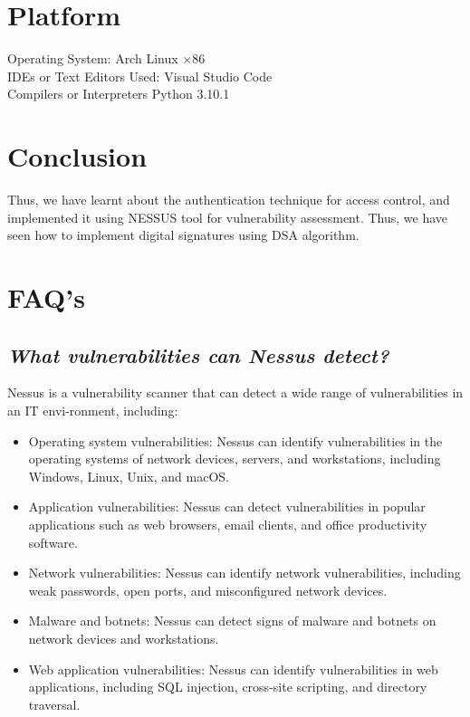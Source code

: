\documentclass{article}
\begin{document}
\section{\textbf{Platform}}
Operating System: Arch Linux ×86\\
IDEs or Text Editors Used: Visual Studio Code\\
Compilers or Interpreters \: Python 3.10.1

\section{\textbf{Conclusion}}
Thus, we have learnt about the authentication technique for access control, and implemented it using NESSUS tool for vulnerability assessment. Thus, we have seen how to implement digital signatures using DSA algorithm.

\section{\textbf{FAQ's}}
\subsection{\textit{What vulnerabilities can Nessus detect?}}
Nessus is a vulnerability scanner that can detect a wide range of vulnerabilities in an IT envi-ronment, including:
\begin{itemize}
	\item Operating system vulnerabilities: Nessus can identify vulnerabilities in the operating systems of network devices, servers, and workstations, including Windows, Linux, Unix, and macOS.
	\item Application vulnerabilities: Nessus can detect vulnerabilities in popular applications such as web browsers, email clients, and office productivity software.
	\item Network vulnerabilities: Nessus can identify network vulnerabilities, including weak passwords, open ports, and misconfigured network devices.
	\item Malware and botnets: Nessus can detect signs of malware and botnets on network devices and workstations.
	\item Web application vulnerabilities: Nessus can identify vulnerabilities in web applications, including SQL injection, cross-site scripting, and directory traversal.
	
\end{itemize}
\end{document}
